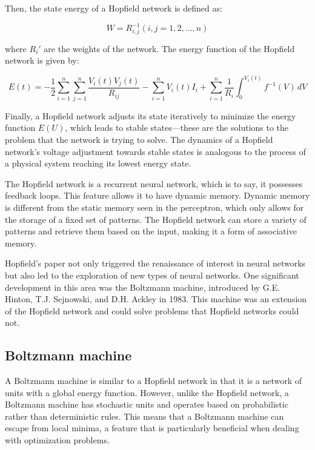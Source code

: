 \documentclass[paper=a4, fontsize=11pt]{scrartcl} %
\numberwithin{equation}{section} %
\numberwithin{figure}{section} %
\numberwithin{table}{section} %
\begin{document}
Then, the state energy of a Hopfield network is defined as:

\begin{equation}
W = R_{i,j}^{-1} (i,j=1,2,...,n)
\end{equation}

where \( R_i' \) are the weights of the network. The energy function of the Hopfield network is given by:

\begin{equation}
    E(t) = -\frac{1}{2} \sum_{i=1}^{n} \sum_{j=1}^{n} \frac{V_i(t)V_j(t)}{R_{ij}} - \sum_{i=1}^{n} V_i(t)I_i + \sum_{i=1}^{n} \frac{1}{R_i} \int_{0}^{V_i(t)} f^{-1}(V) \, dV
\end{equation}

Finally, a Hopfield network adjusts its state iteratively to minimize the energy function \( E(U) \), which leads to stable states—these are the solutions to the problem that the network is trying to solve. The dynamics of a Hopfield network's voltage adjustment towards stable states is analogous to the process of a physical system reaching its lowest energy state.

The Hopfield network is a recurrent neural network, which is to say, it possesses feedback loops. This feature allows it to have dynamic memory. Dynamic memory is different from the static memory seen in the perceptron, which only allows for the storage of a fixed set of patterns. The Hopfield network can store a variety of patterns and retrieve them based on the input, making it a form of associative memory.

Hopfield's paper not only triggered the renaissance of interest in neural networks but also led to the exploration of new types of neural networks. One significant development in this area was the Boltzmann machine, introduced by G.E. Hinton, T.J. Sejnowski, and D.H. Ackley in 1983. This machine was an extension of the Hopfield network and could solve problems that Hopfield networks could not.

\subsection{Boltzmann machine}

A Boltzmann machine is similar to a Hopfield network in that it is a network of units with a global energy function. However, unlike the Hopfield network, a Boltzmann machine has stochastic units and operates based on probabilistic rather than deterministic rules. This means that a Boltzmann machine can escape from local minima, a feature that is particularly beneficial when dealing with optimization problems.
\end{document}
